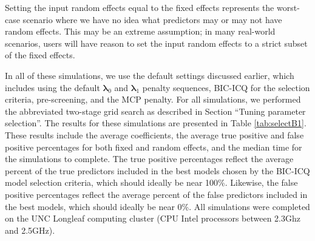 Setting the input random effects equal to the fixed effects represents the worst-case scenario where we have no idea what predictors may or may not have random effects. This may be an extreme assumption; in many real-world scenarios, users will have reason to set the input random effects to a strict subset of the
fixed effects.

In all of these simulations, we use the default settings discussed earlier, which includes using the default $\boldsymbol \lambda_0$ and $\boldsymbol \lambda_1$ penalty sequences, BIC-ICQ for the selection criteria, pre-screening, and the MCP penalty. For all simulations, we performed the abbreviated two-stage grid search as described in Section ``Tuning parameter selection''. 
The results for these simulations are presented in Table \ref{tab:selectB1}. 
These results include the average coefficients, the average true positive and false positive percentages for both fixed and random effects, and the median time for the simulations to complete. The true positive percentages reflect the average percent of the true predictors included in the best models chosen by the BIC-ICQ model selection criteria, which should ideally be near 100\%. Likewise, the false positive percentages reflect the average percent of the false predictors included in the best models, which should ideally be near 0\%. All simulations were completed on the UNC Longleaf computing cluster (CPU Intel processors between 2.3Ghz and 2.5GHz).

